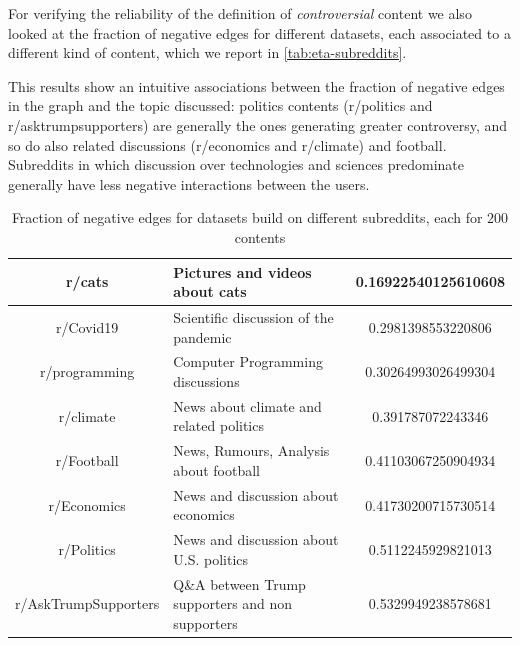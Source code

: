 \bigskip
For verifying the reliability of the definition of \emph{controversial} content
we also looked at the fraction of negative edges for different datasets, each
associated to a different kind of content, which we report in
\autoref{tab:eta-subreddits}.

This results show an intuitive associations between the fraction of negative edges in the
graph and the topic discussed: politics contents
(r/politics and r/asktrumpsupporters) are generally the ones generating greater
controversy, and so do also related discussions (r/economics and r/climate) and
football. Subreddits in which discussion over technologies and sciences
predominate generally have less negative interactions between the users.


\begin{table}
	\centering
	\caption[Fraction of negative edges in different subreddits]{Fraction of negative edges for datasets build on different
		subreddits, each for $200$ contents}
	\label{tab:eta-subreddits}
	{\small
		\begin{tabular}{c | p{6cm} | c}
			r/cats               & Pictures and videos about cats                & \num{0.16922540125610608} \\
			\hline
			r/Covid19            & Scientific discussion of the pandemic         & \num{0.2981398553220806}  \\
			\hline
			r/programming        & Computer Programming discussions              & \num{0.30264993026499304} \\
			\hline
			r/climate            & News about climate and related politics       & \num{0.391787072243346}   \\
			\hline
			r/Football           & News, Rumours, Analysis about \mbox{football} & \num{0.41103067250904934} \\
			\hline
			r/Economics          & News and discussion about economics           & \num{0.41730200715730514} \\
			\hline
			r/Politics           & News and discussion about U.S. politics       & \num{0.5112245929821013}  \\
			\hline
			r/AskTrumpSupporters & {Q\&A between Trump supporters and non
			supporters}          & \num{0.5329949238578681}                                                  \\
		\end{tabular}
	}
\end{table}

